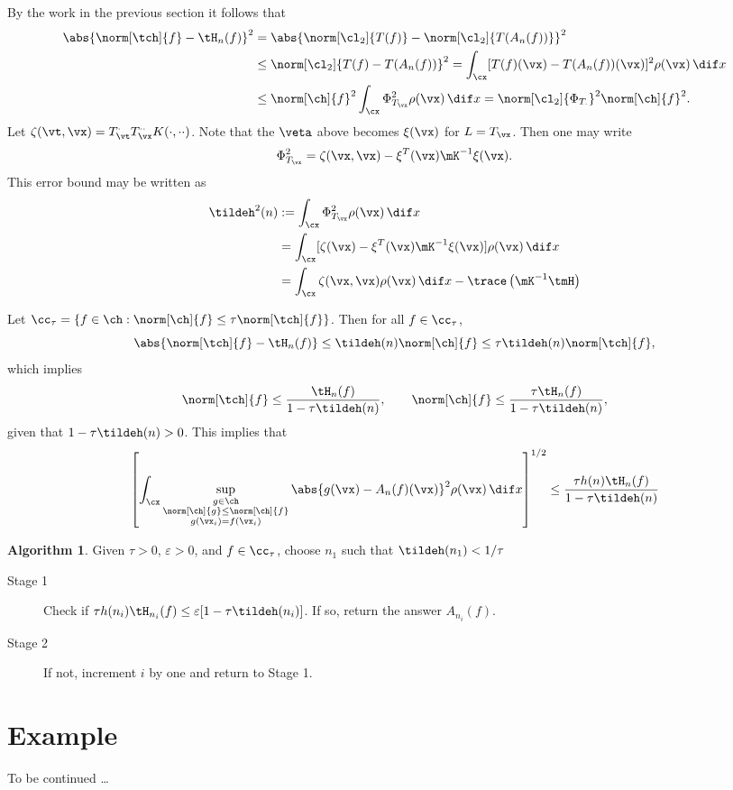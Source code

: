 \documentclass[11pt]{amsart}
\theoremstyle{definition}
\newtheorem{algo}{Algorithm}
\begin{document}
By the work in the previous section it follows that
\begin{align*}
\abs{\norm[\tch]{f} - \tH_n(f)}^2 &= \abs{\norm[\cl_2]{T(f)} - \norm[\cl_2]{T(A_n(f))}}^2\\
&\le  \norm[\cl_2]{T(f)-T(A_n(f))}^2 = \int_{\cx} [T(f)(\vx)-T(A_n(f))(\vx)]^2 \rho(\vx) \, \dif x\\
&\le \norm[\ch]{f}^2 \int_{\cx} \Phi_{T_{\vx}}^2  \rho(\vx) \, \dif x = \norm[\cl_2]{\Phi_{T_{\cdot}}}^2 \norm[\ch]{f}^2.
\end{align*}
Let $\zeta(\vt,\vx)=T^{\cdot}_{\vt}T^{\cdot\cdot}_{\vx}K(\cdot,\cdot\cdot)$.  Note that the $\veta$ above becomes $\xi(\vx)$ for $L=T_{\vx}$.  Then one may write
\[
\Phi_{T_{\vx}}^2 = \zeta(\vx,\vx) - \xi^T(\vx) \mK^{-1} \xi(\vx).
\]
This error bound may be written as
\begin{align*}
\tildeh^2(n) &:= \int_{\cx} \Phi_{T_{\vx}}^2  \rho(\vx) \, \dif x \\
&= \int_{\cx} [\zeta(\vx) - \xi^T(\vx) \mK^{-1} \xi(\vx)]  \rho(\vx) \, \dif x\\
&= \int_{\cx} \zeta(\vx,\vx) \rho(\vx) \, \dif x - \trace\left( \mK^{-1} \tmH \right)
\end{align*}

Let $\cc_{\tau}=\{ f \in \ch :  \norm[\ch]{f} \le \tau \norm[\tch]{f}\}$.  Then for all $f \in \cc_{\tau}$,
\[
\abs{\norm[\tch]{f} - \tH_n(f)} \le \tildeh (n) \norm[\ch]{f} \le \tau \tildeh (n) \norm[\tch]{f},
\]
which implies
\[
\norm[\tch]{f} \le \frac{\tH_n(f)}{1-\tau \tildeh(n)}, \qquad \norm[\ch]{f} \le \frac{\tau \tH_n(f)}{1-\tau \tildeh(n)},
\]
given that $1-\tau\tildeh(n)>0$. This implies that
\[
\left[\int_{\cx} \sup_{\substack{g \in \ch \\ \norm[\ch]{g} \le \norm[\ch]{f} \\g(\vx_i)=f(\vx_i) }} \abs{g(\vx) - A_n(f)(\vx)}^2 \rho(\vx) \, \dif x \right ]^{1/2} \le \frac{\tau h(n) \tH_n(f)}{1-\tau \tildeh(n)}
\]

\begin{algo}  Given $\tau>0$, $\varepsilon>0$, and $f \in \cc_\tau$, choose $n_1$ such that $\tildeh(n_1) < 1/\tau$

\begin{description}
\item[Stage 1] Check if $\tau h(n_i) \tH_{n_i}(f) \le \varepsilon[1-\tau \tildeh(n_i)]$.  If so, return the answer $A_{n_i}(f)$.

\item[Stage 2]  If not, increment $i$ by one and return to Stage 1.
\end{description}
\end{algo}

\section{Example} To be continued \ldots


\end{document}
